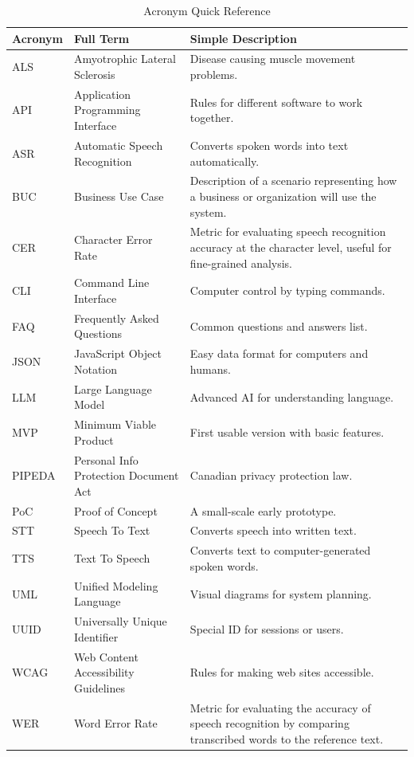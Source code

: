 \documentclass[11pt]{article}
\begin{document}
\begin{table}[ht]
\centering
\begin{tabular}{|l|l|p{7cm}|}
\hline
\textbf{Acronym} & \textbf{Full Term} & \textbf{Simple Description} \\
\hline
ALS     & Amyotrophic Lateral Sclerosis          & Disease causing muscle movement problems. \\
API     & Application Programming Interface      & Rules for different software to work together. \\
ASR     & Automatic Speech Recognition           & Converts spoken words into text automatically. \\
BUC     & Business Use Case         & Description of a scenario representing how a business or organization will use the system. \\
CER     & Character Error Rate      & Metric for evaluating speech recognition accuracy at the character level, useful for fine-grained analysis. \\
CLI     & Command Line Interface                 & Computer control by typing commands. \\
FAQ     & Frequently Asked Questions             & Common questions and answers list. \\
JSON    & JavaScript Object Notation             & Easy data format for computers and humans. \\
LLM     & Large Language Model                   & Advanced AI for understanding language. \\
MVP     & Minimum Viable Product                 & First usable version with basic features. \\
PIPEDA  & Personal Info Protection Document Act  & Canadian privacy protection law. \\
PoC     & Proof of Concept                       & A small-scale early prototype. \\
STT     & Speech To Text                        & Converts speech into written text. \\
TTS     & Text To Speech                        & Converts text to computer-generated spoken words. \\
UML     & Unified Modeling Language              & Visual diagrams for system planning. \\
UUID    & Universally Unique Identifier          & Special ID for sessions or users. \\
WCAG    & Web Content Accessibility Guidelines   & Rules for making web sites accessible. \\
WER     & Word Error Rate           & Metric for evaluating the accuracy of speech recognition by comparing transcribed words to the reference text. \\

\hline
\end{tabular}
\caption{Acronym Quick Reference}
\label{tab:acronyms}
\end{table}
\end{document}
